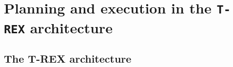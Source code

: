 \section{Planning and execution in the \texttt{T-REX} architecture}
\label{sec:arch}

\subsection{The T-REX architecture}
\label{sec:arch:trex}

 
